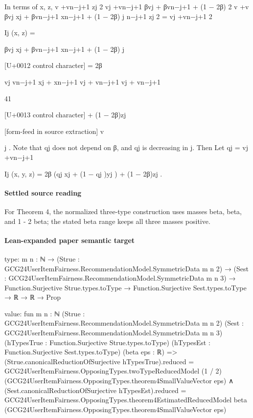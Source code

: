 \documentclass[10pt]{article}
\begin{document}
\begin{ReviewVerbatim}

In terms of x, z,
v +vn−j+1
zj
2
vj +vn−j+1
βvj + βvn−j+1 + (1 − 2β)
2
v +v
βvj xj + βvn−j+1 xn−j+1 + (1 − 2β) j n−j+1
zj
2
=
vj +vn−j+1
2

Ij (x, z) =

βvj xj + βvn−j+1 xn−j+1 + (1 − 2β) j

[U+0012 control character]
= 2β

vj
vn−j+1
xj +
xn−j+1
vj + vn−j+1
vj + vn−j+1

41

[U+0013 control character]
+ (1 − 2β)zj


[form-feed in source extraction]
v

j
. Note that qj does not depend on β, and qj is decreasing in j. Then
Let qj = vj +vn−j+1

Ij (x, y, z) = 2β (qj xj + (1 − qj )yj ) + (1 − 2β)zj .
\end{ReviewVerbatim}

\paragraph{Settled source reading}
For Theorem 4, the normalized three-\allowbreak{}type construction uses masses beta, beta, and 1 -\allowbreak{} 2 beta;\allowbreak{} the stated beta range keeps all three masses positive.\allowbreak{}

\paragraph{Lean-expanded paper semantic target}
\begin{ReviewVerbatim}
type:
{m n : ℕ} →
  (Strue : GCG24UserItemFairness.RecommendationModel.SymmetricData m n 2) →
    (Sest : GCG24UserItemFairness.RecommendationModel.SymmetricData m n 3) →
      Function.Surjective Strue.types.toType → Function.Surjective Sest.types.toType → ℝ → ℝ → Prop

value:
fun {m n : ℕ} (Strue : GCG24UserItemFairness.RecommendationModel.SymmetricData m n 2)
    (Sest : GCG24UserItemFairness.RecommendationModel.SymmetricData m n 3)
    (hTypesTrue : Function.Surjective Strue.types.toType) (hTypesEst : Function.Surjective Sest.types.toType)
    (beta eps : ℝ) =>
  (Strue.canonicalReductionOfSurjective hTypesTrue).reduced =
      GCG24UserItemFairness.OpposingTypes.twoTypeReducedModel (1 / 2)
        (GCG24UserItemFairness.OpposingTypes.theorem4SmallValueVector eps) ∧
    (Sest.canonicalReductionOfSurjective hTypesEst).reduced =
      GCG24UserItemFairness.OpposingTypes.theorem4EstimatedReducedModel beta
        (GCG24UserItemFairness.OpposingTypes.theorem4SmallValueVector eps)
\end{ReviewVerbatim}
\end{document}

